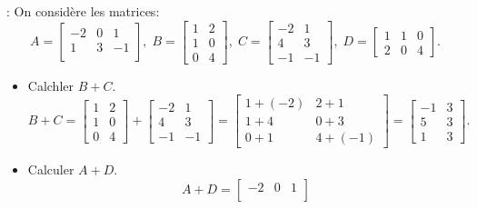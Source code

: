 \documentclass[12pt,a4paper]{book}
\numberwithin{definition}{chapter}
\theoremstyle{plain}
\begin{document}
	\begin{example}: On considère les matrices: 
		\begin{equation*}
			A=
			\begin{bmatrix}
				-2 & 0 & 1\\
				1 & 3  & -1\\
			\end{bmatrix},\;
			B=
			\begin{bmatrix}
				1 & 2 \\
				1 & 0 \\
				0 & 4
			\end{bmatrix},\;
			C=
			\begin{bmatrix}
				-2 & 1 \\
				4 & 3 \\
				-1 & -1
			\end{bmatrix},\;
			D=
			\begin{bmatrix}
				1 & 1 & 0\\
				2 & 0 & 4
			\end{bmatrix}.
		\end{equation*}
		\begin{itemize}
			\item[\ding{43}] Calchler $B+C$.
			\begin{equation*}
				B+C=\begin{bmatrix}
					1 & 2 \\
					1 & 0 \\
					0 & 4
				\end{bmatrix}+
				\begin{bmatrix}
					-2 & 1 \\
					4 & 3 \\
					-1 & -1
				\end{bmatrix}=
				\begin{bmatrix}
					1+(-2) & 2+1 \\
					1+4 & 0+3 \\
					0+1 & 4+(-1)
				\end{bmatrix}=
				\begin{bmatrix}
					-1 & 3 \\
					5 & 3 \\
					1 & 3
				\end{bmatrix}.
			\end{equation*} 
			\item[\ding{43}] Calculer $A+D$.
			\begin{equation*}
				A+D=\begin{bmatrix}
					-2 & 0 & 1 \\

\end{bmatrix}
\end{equation*}
\end{itemize}
\end{example}
\end{document}
